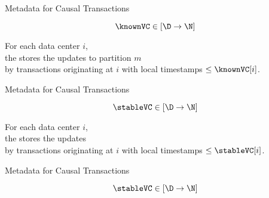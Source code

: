 \begin{frame}{Metadata for Causal Transactions}
  \begin{center}
    \[
      \knownVC \in [\D \to \N]
    \]

    \begin{property}
      \begin{center}
        For each data center $i$, \\[3pt]
        the  stores the updates to partition $m$ \\[3pt]
        by transactions originating at $i$
        with local timestamps $\le \knownVC[i]$.
      \end{center}
    \end{property}
  \end{center}
\end{frame}

\begin{frame}{Metadata for Causal Transactions}
  \begin{center}
    \[
      \stableVC \in [\D \to \N]
    \]

    \begin{property}
      \begin{center}
        For each data center $i$, \\[3pt]
        the  stores the updates \\[3pt]
        by transactions originating at $i$ with local timestamps $\le \stableVC[i]$.
      \end{center}
    \end{property}
  \end{center}
\end{frame}

\begin{frame}{Metadata for Causal Transactions}
  \begin{center}

    \[
      \stableVC \in [\D \to \N]
    \]

  \end{center}
\end{frame}


